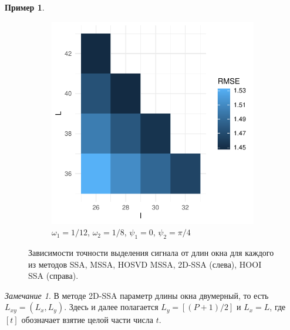 \documentclass[specialist,
    substylefile = spbu_report.rtx,
    subf,href,colorlinks=true, 12pt]{disser}
\theoremstyle{plain}
\theoremstyle{definition}
\newtheorem{example}{Пример}[section]
\theoremstyle{remark}
\newtheorem*{remark}{Замечание}
\begin{document}
\begin{example}
\begin{figure}
\begin{subfigure}{\linewidth}
                \includegraphics[width=.34\linewidth]{two-series-third_hooi}
                \caption{$\omega_1=1/12$, $\omega_2=1/8$, $\psi_1=0$, $\psi_2=\pi / 4$}
            \end{subfigure}
            \caption{Зависимости точности выделения сигнала от длин окна для каждого из методов
            SSA, MSSA, HOSVD MSSA, 2D-SSA (слева), HOOI SSA (справа).}
            \label{fig:two-series-example}
        \end{figure}

        \begin{remark}
            В методе 2D-SSA параметр длины окна двумерный, то есть $L_{xy}=(L_x, L_y)$.
            Здесь и далее полагается $L_y = [(P + 1) / 2]$ и $L_x=L$, где $[t]$ обозначает взятие
            целой части числа $t$.
        \end{remark}
    \end{example}
\end{document}

